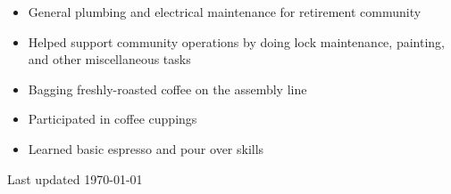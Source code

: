 \begin{paracol}{2}
{
\begin{itemize}
  \item General plumbing and electrical maintenance for retirement community
  \item Helped support community operations by doing lock maintenance, painting, and other miscellaneous tasks
\end{itemize}
\spacevv

\begin{itemize}
  \item Bagging freshly-roasted coffee on the assembly line
  \item Participated in coffee cuppings
  \item Learned basic espresso and pour over skills
\end{itemize}

}


\normaltext \hfill \tiny Last updated \today

\end{paracol}


